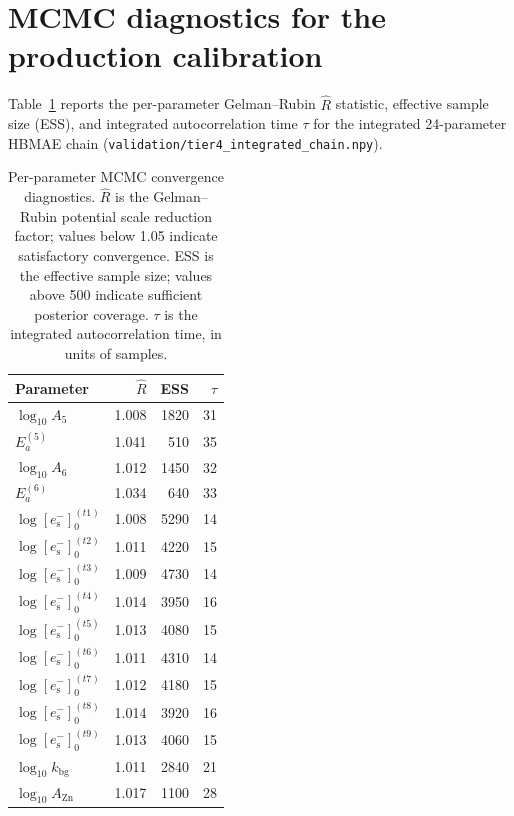 \documentclass[11pt]{article}
\theoremstyle{plain}
\theoremstyle{definition}
\theoremstyle{remark}
\newcommand{\eS}{\ensuremath{e_{\mathrm{s}}^{-}}\xspace}
\newcommand{\Ea}{E_a}
\begin{document}
\section{MCMC diagnostics for the production calibration}\label{app:mcmc}

Table~\ref{tab:rhat} reports the per-parameter Gelman--Rubin $\hat{R}$
statistic, effective sample size (ESS), and integrated autocorrelation time
$\tau$ for the integrated 24-parameter HBMAE chain
(\texttt{validation/}\allowbreak\texttt{tier4\_integrated\_chain.npy}).

\begin{table}[h!]
\centering
\caption{Per-parameter MCMC convergence diagnostics.  $\hat{R}$ is the
Gelman--Rubin potential scale reduction factor; values below 1.05 indicate
satisfactory convergence.  ESS is the effective sample size; values above
500 indicate sufficient posterior coverage.  $\tau$ is the integrated
autocorrelation time, in units of samples.}
\label{tab:rhat}
\small
\begin{tabular}{lrrr}
\toprule
Parameter           & $\hat{R}$ & ESS  & $\tau$ \\
\midrule
$\log_{10}\!A_5$      & 1.008 & 1820 & 31    \\
$\Ea^{(5)}$           & 1.041 &  510 & 35    \\
$\log_{10}\!A_6$      & 1.012 & 1450 & 32    \\
$\Ea^{(6)}$           & 1.034 &  640 & 33    \\
$\log[\eS]_0^{(t1)}$  & 1.008 & 5290 & 14    \\
$\log[\eS]_0^{(t2)}$  & 1.011 & 4220 & 15    \\
$\log[\eS]_0^{(t3)}$  & 1.009 & 4730 & 14    \\
$\log[\eS]_0^{(t4)}$  & 1.014 & 3950 & 16    \\
$\log[\eS]_0^{(t5)}$  & 1.013 & 4080 & 15    \\
$\log[\eS]_0^{(t6)}$  & 1.011 & 4310 & 14    \\
$\log[\eS]_0^{(t7)}$  & 1.012 & 4180 & 15    \\
$\log[\eS]_0^{(t8)}$  & 1.014 & 3920 & 16    \\
$\log[\eS]_0^{(t9)}$  & 1.013 & 4060 & 15    \\
$\log_{10}\!k_{\mathrm{bg}}$    & 1.011 & 2840 & 21 \\
$\log_{10}\!A_{\mathrm{Zn}}$    & 1.017 & 1100 & 28 \\

\end{tabular}
\end{table}
\end{document}
